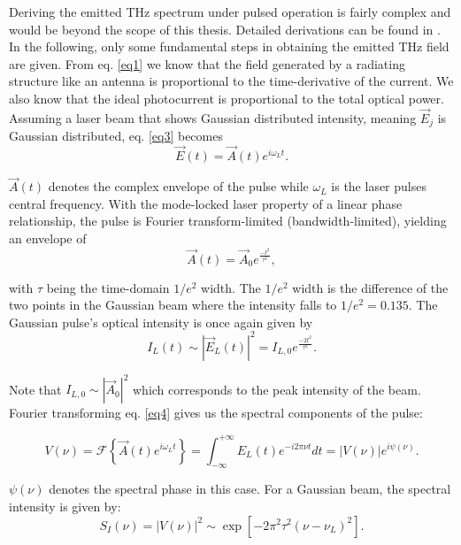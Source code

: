 Deriving the emitted THz spectrum under pulsed operation is fairly complex and would be beyond the scope of this thesis. Detailed derivations can be found in \cite{preuPrinciplesTHzGeneration2015}. In the following, only some fundamental steps in obtaining the emitted THz field are given. From eq. \eqref{eq1} we know that the field generated by a radiating structure like an antenna is proportional to the time-derivative of the current. We also know that the ideal photocurrent is proportional to the total optical power. Assuming a laser beam that shows Gaussian distributed intensity, meaning $\vec{E}_j$ is Gaussian distributed, eq. \eqref{eq3} becomes
\begin{equation}
	\vec{E}(t) = \vec{A}(t)e^{i\omega_Lt}.
\label{eq4} 
\end{equation}

$\vec{A}(t)$ denotes the complex envelope of the pulse while $\omega_L$ is the laser pulses central frequency. With the mode-locked laser property of a linear phase relationship, the pulse is Fourier transform-limited (bandwidth-limited), yielding an envelope of
\begin{equation}
	\vec{A}(t) = \vec{A}_0 e^{\frac{-t^2}{\tau^2}},
\end{equation}

with $\tau$ being the time-domain $1/e^2$ width. The  $1/e^2$ width is the difference of the two points in the Gaussian beam where the intensity falls to $1/e^2 = 0.135$. The Gaussian pulse's optical intensity is once again given by
\begin{equation}
	I_L(t) \sim |\vec{E}_L(t)|^2 = I_{L,0}e^{\frac{-2t^2}{\tau ^2}}.
\end{equation} 

Note that $I_{L,0} \sim |\vec{A}_0|^2$ which corresponds to the peak intensity of the beam. 
Fourier transforming eq. \eqref{eq4} gives us the spectral components of the pulse:

\begin{equation}
	V(\nu) =  \mathcal{F}\left\{\vec{A}(t)e^{i\omega_Lt} \right\}
	= \int_{-\infty}^{+\infty}E_L(t)e^{-i2\pi\nu t}dt = |V(\nu)|e^{i\psi(\nu)}.
\end{equation}

$\psi(\nu)$ denotes the spectral phase in this case. For a Gaussian beam, the spectral intensity is given by:
\begin{equation}
	S_I(\nu) = |V(\nu)|^2 \sim \exp[-2\pi^2\tau^2(\nu - \nu_L)^2]. 
\end{equation}


